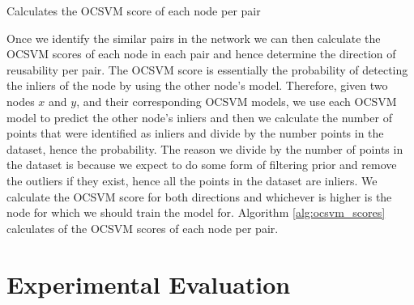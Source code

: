 \documentclass{mpaper}
\begin{document}
\begin{algorithm}
    \DontPrintSemicolon
    \caption{Calculates the OCSVM score of each node per pair
    }\label{alg:ocsvm_scores}
    
    
\end{algorithm}

Once we identify the similar pairs in the network we can then calculate the OCSVM scores of each node in each pair and hence determine the direction of reusability per pair. The OCSVM score is essentially the probability of detecting the inliers of the node by using the other node's model.  Therefore, given two nodes $x$ and $y$, and their corresponding OCSVM models, we use each OCSVM model to predict the other node's inliers and then we calculate the number of points that were identified as inliers and divide by the number points in the dataset, hence the probability. The reason we divide by the number of points in the dataset is because we expect to do some form of filtering prior and remove the outliers if they exist, hence all the points in the dataset are inliers. We calculate the OCSVM score for both directions and whichever is higher is the node for which we should train the model for. Algorithm \ref{alg:ocsvm_scores} calculates of the OCSVM scores of each node per pair.

\section{Experimental Evaluation}
\end{document}
